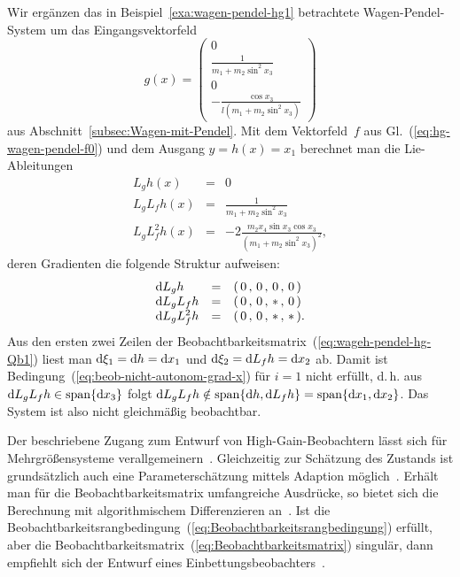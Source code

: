 \begin{example}
Wir ergänzen das in Beispiel~\ref{exa:wagen-pendel-hg1} betrachtete
Wagen-Pendel-System um das Eingangsvektorfeld
\[
g(x)=\left(\begin{array}{c}
0\\
\frac{1}{m_{1}+m_{2}\sin^{2}x_{3}}\\
0\\
-\frac{\cos x_{3}}{l(m_{1}+m_{2}\sin^{2}x_{3})}
\end{array}\right)
\]
aus Abschnitt~\ref{subsec:Wagen-mit-Pendel}. Mit dem Vektorfeld~$f$
aus Gl.~(\ref{eq:hg-wagen-pendel-f0}) und dem Ausgang $y=h(x)=x_{1}$
berechnet man die Lie-Ableitungen 
\[
\begin{array}{lcl}
L_{g}h(x) & = & 0\\
L_{g}L_{f}h(x) & = & \frac{1}{m_{1}+m_{2}\sin^{2}x_{3}}\\
L_{g}L_{f}^{2}h(x) & = & -2\frac{m_{2}x_{4}\sin x_{3}\cos x_{3}}{(m_{1}+m_{2}\sin^{2}x_{3})^{2}},
\end{array}
\]
deren Gradienten die folgende Struktur aufweisen:
\[
\begin{array}{lcc}
{\mathrm{d}} L_{g}h & = & (\,0\,,\,0\,,\,0\,,\,0\,)\phantom{.}\\
{\mathrm{d}} L_{g}L_{f}h & = & (\,0\,,\,0\,,\,*\,,\,0\,)\phantom{.}\\
{\mathrm{d}} L_{g}L_{f}^{2}h & = & (\,0\,,\,0\,,\,*\,,\,*\,).
\end{array}
\]
Aus den ersten zwei Zeilen der Beobachtbarkeitsmatrix~(\ref{eq:wageh-pendel-hg-Qb1})
liest man ${\mathrm{d}}\xi_{1}={\mathrm{d}} h={\mathrm{d}} x_{1}$ und ${\mathrm{d}}\xi_{2}={\mathrm{d}} L_{f}h={\mathrm{d}} x_{2}$
ab. Damit ist Bedingung~(\ref{eq:beob-nicht-autonom-grad-x}) für
$i=1$ nicht erfüllt, d.\,h. aus ${\mathrm{d}} L_{g}L_{f}h\in{\operatorname{span}}\{{\mathrm{d}} x_{3}\}$
folgt ${\mathrm{d}} L_{g}L_{f}h\notin{\operatorname{span}}\{{\mathrm{d}} h,{\mathrm{d}} L_{f}h\}={\operatorname{span}}\{{\mathrm{d}} x_{1},{\mathrm{d}} x_{2}\}$.
Das System ist also nicht gleichmäßig beobachtbar.
\end{example}

\begin{remark}
Der beschriebene Zugang zum Entwurf von High-Gain-Beobachtern lässt
sich für Mehrgrößensysteme verallgemeinern~\cite{dalla-mora2000}.
Gleichzeitig zur Schätzung des Zustands ist grundsätzlich auch eine
Parameterschätzung mittels Adaption möglich~\cite{bullinger1997cdc,besancon2004}.
Erhält man für die Beobachtbarkeitsmatrix umfangreiche Ausdrücke,
so bietet sich die Berechnung mit algorithmischem Differenzieren an~\cite{rr2000nolta,roebenack2005dsmc,roebenack2005habil}.
Ist die Beobachtbarkeitsrangbedingung~(\ref{eq:Beobachtbarkeitsrangbedingung})
erfüllt, aber die Beobachtbarkeitsmatrix~(\ref{eq:Beobachtbarkeitsmatrix})
singulär, dann empfiehlt sich der Entwurf eines Einbettungsbeobachters~\cite{gauthier91}.
\end{remark}

